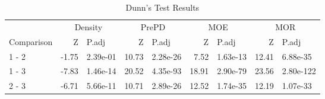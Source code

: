 
\begin{longtable}[t]{lrlrlrlrl}
\caption{Dunn's Test Results}\\
\toprule
\multicolumn{1}{c}{ } & \multicolumn{2}{c}{Density} & \multicolumn{2}{c}{PrePD} & \multicolumn{2}{c}{MOE} & \multicolumn{2}{c}{MOR} \\
\cmidrule(l{3pt}r{3pt}){2-3} \cmidrule(l{3pt}r{3pt}){4-5} \cmidrule(l{3pt}r{3pt}){6-7} \cmidrule(l{3pt}r{3pt}){8-9}
Comparison & Z & P.adj & Z & P.adj & Z & P.adj & Z & P.adj\\
\midrule
1 - 2 & -1.75 & 2.39e-01 & 10.73 & 2.28e-26 & 7.52 & 1.63e-13 & 12.41 & 6.88e-35\\
1 - 3 & -7.83 & 1.46e-14 & 20.52 & 4.35e-93 & 18.91 & 2.90e-79 & 23.56 & 2.80e-122\\
2 - 3 & -6.71 & 5.66e-11 & 10.71 & 2.89e-26 & 12.52 & 1.74e-35 & 12.19 & 1.07e-33\\
\bottomrule
\end{longtable}